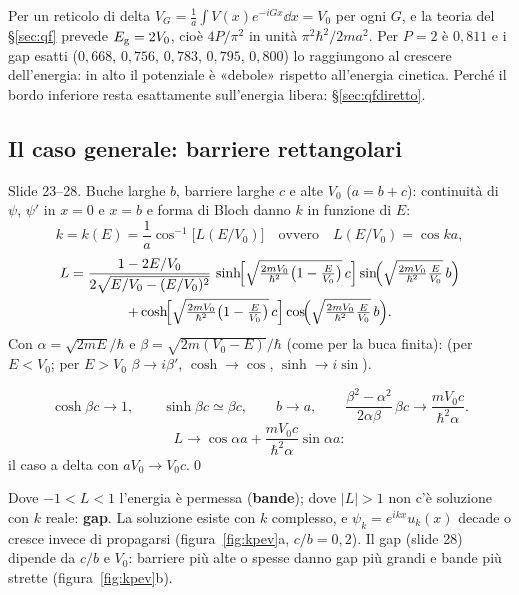 \documentclass[11pt,a4paper]{article}
\begin{document}
Per un reticolo di delta $V_G=\frac1a\int V(x)e^{-iGx}\dd x=V_0$ per ogni $G$, e la teoria del §\ref{sec:qf} prevede $E_{\mathrm g}=2V_0$, cioè $4P/\pi^2$ in unità
$\pi^2\hbar^2/2ma^2$. Per $P=2$ è $0{,}811$ e i gap esatti ($0{,}668$, $0{,}756$, $0{,}783$, $0{,}795$, $0{,}800$) lo raggiungono al crescere dell'energia: in alto il
potenziale è «debole» rispetto all'energia cinetica. Perché il bordo inferiore resta esattamente sull'energia libera: §\ref{sec:qfdiretto}.

\subsection{Il caso generale: barriere rettangolari}\label{sec:rett}
Slide 23--28. Buche larghe $b$, barriere larghe $c$ e alte $V_0$ ($a=b+c$): continuità di $\psi$, $\psi'$ in $x=0$ e $x=b$ e forma di Bloch danno $k$ in funzione di $E$:
\[
k=k(E)=\frac1a\cos^{-1}\!\bigl[L(E/V_0)\bigr]\quad\text{ovvero}\quad L(E/V_0)=\cos ka ,
\]
\begin{multline*}
L=\frac{1-2E/V_0}{2\sqrt{E/V_0-(E/V_0)^2}}\,
\sinh\!\Bigl[\sqrt{\tfrac{2mV_0}{\hbar^2}\bigl(1-\tfrac{E}{V_0}\bigr)}\,c\Bigr]
\sin\!\Bigl(\sqrt{\tfrac{2mV_0}{\hbar^2}\tfrac{E}{V_0}}\,b\Bigr)\\
+\cosh\!\Bigl[\sqrt{\tfrac{2mV_0}{\hbar^2}\bigl(1-\tfrac{E}{V_0}\bigr)}\,c\Bigr]
\cos\!\Bigl(\sqrt{\tfrac{2mV_0}{\hbar^2}\tfrac{E}{V_0}}\,b\Bigr).
\end{multline*}
Con $\alpha=\sqrt{2mE}/\hbar$ e $\beta=\sqrt{2m(V_0-E)}/\hbar$ (come per la buca finita):
(per $E<V_0$; per $E>V_0$ $\beta\to i\beta'$, $\cosh\to\cos$, $\sinh\to i\sin$).

\begin{dimostrazione}
\[
\cosh\beta c\to1,\qquad \sinh\beta c\simeq\beta c,\qquad b\to a,\qquad \frac{\beta^2-\alpha^2}{2\alpha\beta}\,\beta c\to\frac{mV_0c}{\hbar^2\alpha}.
\]
\[
L\to\cos\alpha a+\frac{mV_0c}{\hbar^2\alpha}\sin\alpha a:
\]
il caso a delta con $aV_0\to V_0c$.\qed
\end{dimostrazione}

Dove $-1<L<1$ l'energia è permessa (\textbf{bande}); dove $|L|>1$ non c'è soluzione con $k$ reale: \textbf{gap}. La soluzione esiste con $k$
complesso, e $\psi_k=e^{ikx}u_k(x)$ decade o cresce invece di propagarsi (figura~\ref{fig:kpev}a, $c/b=0{,}2$). Il gap (slide 28) dipende da $c/b$ e $V_0$:
barriere più alte o spesse danno gap più grandi e bande più strette (figura~\ref{fig:kpev}b).
\end{document}
